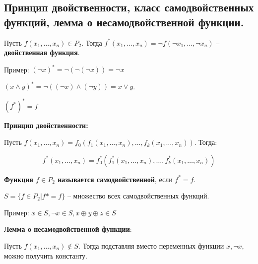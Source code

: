 \subsection{Принцип двойственности, класс самодвойственных функций, лемма о несамодвойственной функции.}

   Пусть $f(x_1, \ldots, x_n) \in P_2$. Тогда $f^*(x_1, \ldots, x_n) = \neg f(\neg x_1, \ldots, \neg x_n)$ -- \textbf{двойственная функция}.

   Пример: $(\neg x)^* = \neg(\neg(\neg x)) = \neg x$

   $(x \wedge y)^* = \neg((\neg x) \wedge (\neg y)) = x \vee y$.

   $(f^*)^* = f$

\textbf{Принцип двойственности:}  

   Пусть $f(x_1,\ldots,x_n) = f_0(f_1(x_1,\ldots,x_n),\ldots,f_k(x_1,\ldots,x_n))$. Тогда:

   $$f^*(x_1,\ldots,x_n) = f_0^*(f_1^*(x_1,\ldots,x_n),\ldots,f_k^*(x_1,\ldots,x_n))$$

 \textbf{Функция $f \in P_2$ называется самодвойственной}, если $f^* = f$.

  $S = \{f \in P_2 | f* = f\}$ -- множество всех самодвойственных функций.

  Пример: $x \in S, \neg x \in S, x \oplus y \oplus z \in S$

  \textbf{Лемма о несамодвойственной функции}:

   Пусть $f(x_1, \ldots, x_n) \notin S$. Тогда подставляя вместо переменных функции $x, \neg x$, можно получить константу.
